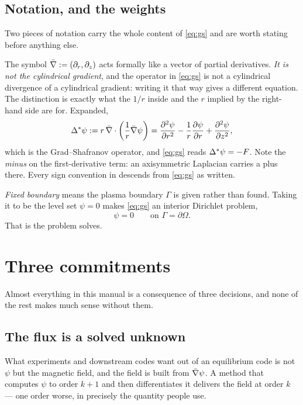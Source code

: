 \subsection{Notation, and the weights}

Two pieces of notation carry the whole content of \eqref{eq:gs} and are worth
stating before anything else.

The symbol $\bar{\nabla} := (\partial_{r}, \partial_{z})$ acts formally like a
vector of partial derivatives. \emph{It is not the cylindrical gradient}, and
the operator in \eqref{eq:gs} is not a cylindrical divergence of a cylindrical
gradient: writing it that way gives a different equation. The distinction is
exactly what the $1/r$ inside and the $r$ implied by the right-hand side are
for. Expanded,
%
\begin{equation}
	\Delta^{*} \psi
		:= r \, \bar{\nabla} \cdot \left( \frac{1}{r} \bar{\nabla} \psi \right)
		 = \frac{\partial^{2}\psi}{\partial r^{2}}
		 - \frac{1}{r} \frac{\partial \psi}{\partial r}
		 + \frac{\partial^{2}\psi}{\partial z^{2}},
	\label{eq:deltastar}
\end{equation}
%
which is the Grad--Shafranov operator, and \eqref{eq:gs} reads
$\Delta^{*} \psi = -F$. Note the \emph{minus} on the first-derivative term: an
axisymmetric Laplacian carries a plus there. Every sign convention in
{\meq} descends from \eqref{eq:gs} as written.

\emph{Fixed boundary} means the plasma boundary $\Gamma$ is given rather than
found. Taking it to be the level set $\psi = 0$ makes \eqref{eq:gs} an interior
Dirichlet problem,
%
\begin{equation}
	\psi = 0 \qquad \text{on } \Gamma = \partial\Omega .
\end{equation}
%
That is the problem {\meq} solves.

\section{Three commitments}

Almost everything in this manual is a consequence of three decisions, and none
of the rest makes much sense without them.

\subsection{The flux is a solved unknown}

What experiments and downstream codes want out of an equilibrium code is not
$\psi$ but the magnetic field, and the field is built from $\bar{\nabla}\psi$. A
method that computes $\psi$ to order $k+1$ and then differentiates it delivers
the field at order $k$ --- one order worse, in precisely the quantity people
use.

